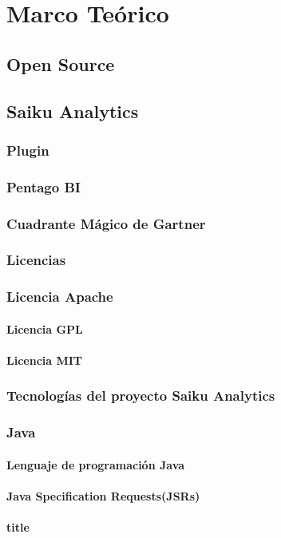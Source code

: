 \chapter{Marco Teórico} \label{chapter:II}
\section{Open Source}
\section{Saiku Analytics}
	\subsection{Plugin}
	\subsection{Pentago BI}
	\subsection{Cuadrante M\'{a}gico de Gartner}
	\subsection{Licencias}
		\subsection{Licencia Apache}
		\subsubsection{Licencia GPL}
		\subsubsection{Licencia MIT}
	\subsection{Tecnolog\'{i}as del proyecto Saiku Analytics}		
	\subsection{Java}
		\subsubsection{Lenguaje de programaci\'{o}n Java}
		\subsubsection{Java Specification Requests(JSRs)}
		\subsubsection{title}
